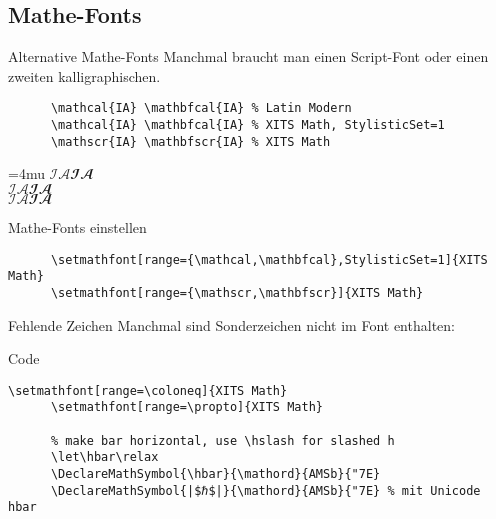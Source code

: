 \subsection{Mathe-Fonts}

\begin{frame}[fragile]{Alternative Mathe-Fonts}
  Manchmal braucht man einen Script-Font oder einen zweiten kalligraphischen.
  \vspace{1em}
  \begin{CodeExample}{0.83}
    \begin{lstlisting}
      \mathcal{IA} \mathbfcal{IA} % Latin Modern
      \mathcal{IA} \mathbfcal{IA} % XITS Math, StylisticSet=1
      \mathscr{IA} \mathbfscr{IA} % XITS Math
    \end{lstlisting}
  \CodeResult
    \Umathordordspacing\textstyle=4mu
    $\mathcal{I A} \mathbfcal{I A}$ \\
    { $\mathcal{I A} \mathbfcal{I A}$} \\
    $\mathscr{I A} \mathbfscr{I A}$
  \end{CodeExample}

  \begin{block}{Mathe-Fonts einstellen}
    \begin{lstlisting}
      \setmathfont[range={\mathcal,\mathbfcal},StylisticSet=1]{XITS Math}
      \setmathfont[range={\mathscr,\mathbfscr}]{XITS Math}
    \end{lstlisting}
  \end{block}
\end{frame}

\begin{frame}[fragile]{Fehlende Zeichen}
  Manchmal sind Sonderzeichen nicht im Font enthalten:
  \vspace{1em}
  \begin{block}{Code}
    \begin{lstlisting}[escapechar=|]
      \setmathfont[range=\coloneq]{XITS Math}
      \setmathfont[range=\propto]{XITS Math}

      % make bar horizontal, use \hslash for slashed h
      \let\hbar\relax
      \DeclareMathSymbol{\hbar}{\mathord}{AMSb}{"7E}
      \DeclareMathSymbol{|$ℏ$|}{\mathord}{AMSb}{"7E} % mit Unicode hbar
    \end{lstlisting}
  \end{block}
\end{frame}
